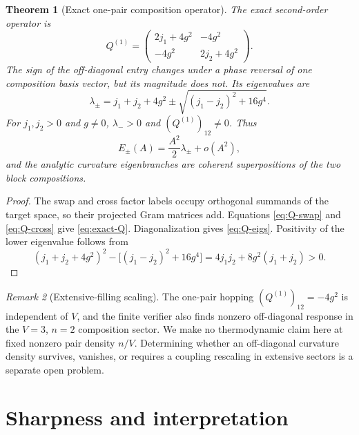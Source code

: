 \documentclass[11pt]{article}
\newtheorem{theorem}{Theorem}[section]
\theoremstyle{remark}
\newtheorem{remark}[theorem]{Remark}
\begin{document}
\begin{theorem}[Exact one-pair composition operator]
\label{thm:escape-Q}
The exact second-order operator is
\begin{equation}
 \boxed{
 Q^{(1)}=
 \begin{pmatrix}
 2j_1+4g^2&-4g^2\\
 -4g^2&2j_2+4g^2
 \end{pmatrix}.}
 \label{eq:exact-Q}
\end{equation}
The sign of the off-diagonal entry changes under a phase reversal of one
composition basis vector, but its magnitude does not.  Its eigenvalues are
\begin{equation}
 \boxed{
 \lambda_\pm
 =j_1+j_2+4g^2
 \pm\sqrt{(j_1-j_2)^2+16g^4}.}
 \label{eq:Q-eigs}
\end{equation}
For $j_1,j_2>0$ and $g\ne0$, $\lambda_->0$ and
$(Q^{(1)})_{12}\ne0$.  Thus
\begin{equation}
 E_\pm(A)=\frac{A^2}{2}\lambda_\pm+o(A^2),
\end{equation}
and the analytic curvature eigenbranches are coherent superpositions of the
two block compositions.
\end{theorem}

\begin{proof}
The swap and cross factor labels occupy orthogonal summands of the target
space, so their projected Gram matrices add.  Equations
\eqref{eq:Q-swap} and \eqref{eq:Q-cross} give \eqref{eq:exact-Q}.
Diagonalization gives \eqref{eq:Q-eigs}.  Positivity of the lower eigenvalue
follows from
\begin{equation}
 (j_1+j_2+4g^2)^2-\bigl[(j_1-j_2)^2+16g^4\bigr]
 =4j_1j_2+8g^2(j_1+j_2)>0.
\end{equation}
\end{proof}

\begin{remark}[Extensive-filling scaling]
The one-pair hopping $(Q^{(1)})_{12}=-4g^2$ is independent of $V$, and the
finite verifier also finds nonzero off-diagonal response in the $V=3$, $n=2$
composition sector.  We make no thermodynamic claim here at fixed nonzero
pair density $n/V$.  Determining whether an off-diagonal curvature density
survives, vanishes, or requires a coupling rescaling in extensive sectors is a
separate open problem.
\end{remark}

\section{Sharpness and interpretation}
\end{document}

